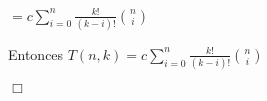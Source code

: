 $ = c  \sum_{i=0}^{n} \frac{k!}{(k-i)!}\binom{n}{i}$ 

Entonces $T(n,k)  = c  \sum_{i=0}^{n} \frac{k!}{(k-i)!}\binom{n}{i}$ 

\begin{flushright}
    \hfill \ensuremath{\Box}
    \end{flushright}






% 
% 
% 
% 
% 
